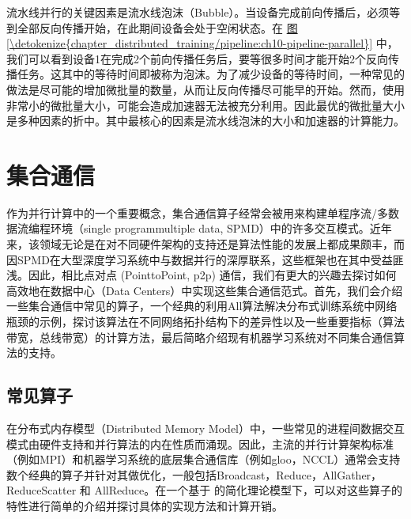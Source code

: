 \documentclass[letterpaper,10pt,english]{sphinxmanual}
\begin{document}
\sphinxAtStartPar
流水线并行的关键因素是流水线泡沫（Bubble）。当设备完成前向传播后，必须等到全部反向传播开始，在此期间设备会处于空闲状态。在
\hyperref[\detokenize{chapter_distributed_training/pipeline:ch10-pipeline-parallel}]{图\ref{\detokenize{chapter_distributed_training/pipeline:ch10-pipeline-parallel}}}
中，我们可以看到设备1在完成2个前向传播任务后，要等很多时间才能开始2个反向传播任务。这其中的等待时间即被称为泡沫。为了减少设备的等待时间，一种常见的做法是尽可能的增加微批量的数量，从而让反向传播尽可能早的开始。然而，使用非常小的微批量大小，可能会造成加速器无法被充分利用。因此最优的微批量大小是多种因素的折中。其中最核心的因素是流水线泡沫的大小和加速器的计算能力。


\section{集合通信}
\label{\detokenize{chapter_distributed_training/collective:id1}}\label{\detokenize{chapter_distributed_training/collective::doc}}
\sphinxAtStartPar
作为并行计算中的一个重要概念，集合通信算子经常会被用来构建单程序流/多数据流编程环境（single
program\sphinxhyphen{}multiple data,
SPMD）中的许多交互模式。近年来，该领域无论是在对不同硬件架构的支持还是算法性能的发展上都成果颇丰，而因SPMD在大型深度学习系统中与数据并行的深厚联系，这些框架也在其中受益匪浅。因此，相比点对点
(Point\sphinxhyphen{}to\sphinxhyphen{}Point, p2p)
通信，我们有更大的兴趣去探讨如何高效地在数据中心（Data
Centers）中实现这些集合通信范式。首先，我们会介绍一些集合通信中常见的算子，一个经典的利用All算法解决分布式训练系统中网络瓶颈的示例，探讨该算法在不同网络拓扑结构下的差异性以及一些重要指标（算法带宽，总线带宽）的计算方法，最后简略介绍现有机器学习系统对不同集合通信算法的支持。


\subsection{常见算子}
\label{\detokenize{chapter_distributed_training/collective:id2}}
\sphinxAtStartPar
在分布式内存模型（Distributed Memory
Model）中，一些常见的进程间数据交互模式由硬件支持和并行算法的内在性质而涌现。因此，主流的并行计算架构标准（例如MPI）和机器学习系统的底层集合通信库（例如gloo，NCCL）通常会支持数个经典的算子并针对其做优化，一般包括Broadcast，Reduce，AllGather，ReduceScatter
和 AllReduce。在一个基于 
的简化理论模型下，可以对这些算子的特性进行简单的介绍并探讨具体的实现方法和计算开销。
\end{document}
